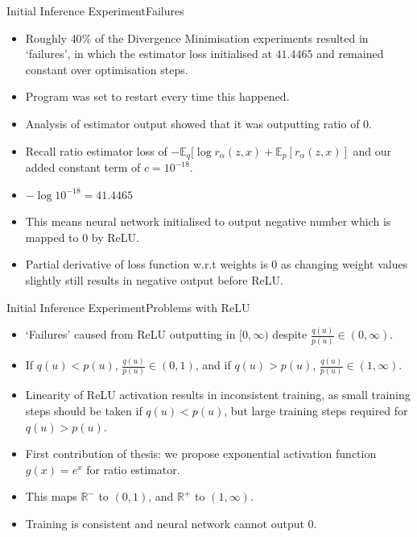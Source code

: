 \documentclass{beamer}
\newcommand{\E}{\mathbb{E}}
\newcommand{\R}{\mathbb{R}}
\begin{document}
\begin{frame}{Initial Inference Experiment}{Failures}
\begin{itemize}
\item Roughly $40\%$ of the Divergence Minimisation experiments resulted in `failures', in which the estimator loss initialised at $41.4465$ and remained constant over optimisation steps.
\item Program was set to restart every time this happened.
\item Analysis of estimator output showed that it was outputting ratio of $0$.
\item Recall ratio estimator loss of $-\E_q[\log r_\alpha(z,x)+\E_p[r_\alpha(z,x)]$ and our added constant term of $c=10^{-18}$.
\item $-\log 10^{-18}=41.4465$
\item This means neural network initialised to output negative number which is mapped to $0$ by ReLU.
\item Partial derivative of loss function w.r.t weights is $0$ as changing weight values slightly still results in negative output before ReLU.
\end{itemize}
\end{frame}
\begin{frame}{Initial Inference Experiment}{Problems with ReLU}
\begin{itemize}
\item `Failures' caused from ReLU outputting in $[0,\infty)$ despite $\frac{q(u)}{p(u)}\in (0,\infty)$.
\item If $q(u)<p(u)$, $\frac{q(u)}{p(u)}\in (0,1)$, and if $q(u)>p(u)$, $\frac{q(u)}{p(u)}\in (1,\infty)$.
\item Linearity of ReLU activation results in inconsistent training, as small training steps should be taken if $q(u)<p(u)$, but large training steps required for $q(u)>p(u)$.
\end{itemize}
\begin{itemize}
\item First contribution of thesis: we propose exponential activation function $g(x)=e^x$ for ratio estimator.
\item This maps $\R^-$ to $(0,1)$, and $\R^+$ to $(1,\infty)$.
\item Training is consistent and neural network cannot output $0$.
\end{itemize}
\end{frame}
\end{document}
